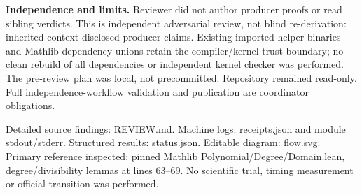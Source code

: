 \documentclass[10pt]{article}
\begin{document}
\textbf{Independence and limits.} Reviewer did not author producer proofs or read sibling verdicts. This is independent adversarial review, not blind re-derivation: inherited context disclosed producer claims. Existing imported helper binaries and Mathlib dependency unions retain the compiler/kernel trust boundary; no clean rebuild of all dependencies or independent kernel checker was performed. The pre-review plan was local, not precommitted. Repository remained read-only. Full independence-workflow validation and publication are coordinator obligations.

Detailed source findings: REVIEW.md. Machine logs: receipts.json and module stdout/stderr. Structured results: status.json. Editable diagram: flow.svg. Primary reference inspected: pinned Mathlib Polynomial/Degree/Domain.lean, degree/divisibility lemmas at lines 63--69. No scientific trial, timing measurement or official transition was performed.
\end{document}
